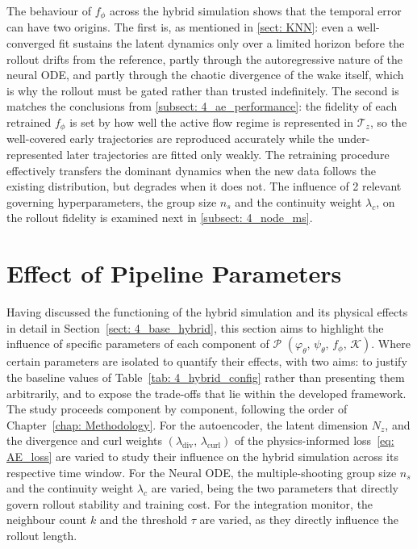 The behaviour of $f_\phi$ across the hybrid simulation shows that the temporal error can have two origins. The first is, as mentioned in \autoref{sect: KNN}: even a well-converged fit sustains the latent dynamics only over a limited horizon before the rollout drifts from the reference, partly through the autoregressive nature of the neural ODE, and partly through the chaotic divergence of the wake itself, which is why the rollout must be gated rather than trusted indefinitely. The second is matches the conclusions from \autoref{subsect: 4_ae_performance}: the fidelity of each retrained $f_\phi$ is set by how well the active flow regime is represented in $\boldsymbol{\mathcal{T}}_z$, so the well-covered early trajectories are reproduced accurately while the under-represented later trajectories are fitted only weakly. The retraining procedure effectively transfers the dominant dynamics when the new data follows the existing distribution, but degrades when it does not. The influence of 2 relevant governing hyperparameters, the group size $n_s$ and the continuity weight $\lambda_c$, on the rollout fidelity is examined next in \autoref{subsect: 4_node_ms}.

\section{Effect of Pipeline Parameters}
\label{sect: 4_p_parameters}

Having discussed the functioning of the hybrid simulation and its physical effects in detail in Section~\ref{sect: 4_base_hybrid}, this section aims to highlight the influence of specific parameters of each component of $\mathcal{P}$  $(\varphi_\theta,\,\psi_\theta,\,f_\phi,\,\mathcal{K})$. Where certain parameters are isolated to quantify their effects, with two aims: to justify the baseline values of Table~\ref{tab: 4_hybrid_config} rather than presenting them arbitrarily, and to expose the trade-offs that lie within the developed framework. The study proceeds component by component, following the order of Chapter~\ref{chap: Methodology}. For the autoencoder, the latent dimension $N_z$, and the divergence and curl weights $(\lambda_\text{div},\,\lambda_\text{curl})$ of the physics-informed loss~\eqref{eq: AE_loss} are varied to study their influence on the hybrid simulation across its respective time window. For the Neural ODE, the multiple-shooting group size $n_s$ and the continuity weight $\lambda_c$ are varied, being the two parameters that directly govern rollout stability and training cost. For the integration monitor, the neighbour count $k$ and the threshold $\tau$ are varied, as they directly influence the rollout length. 

